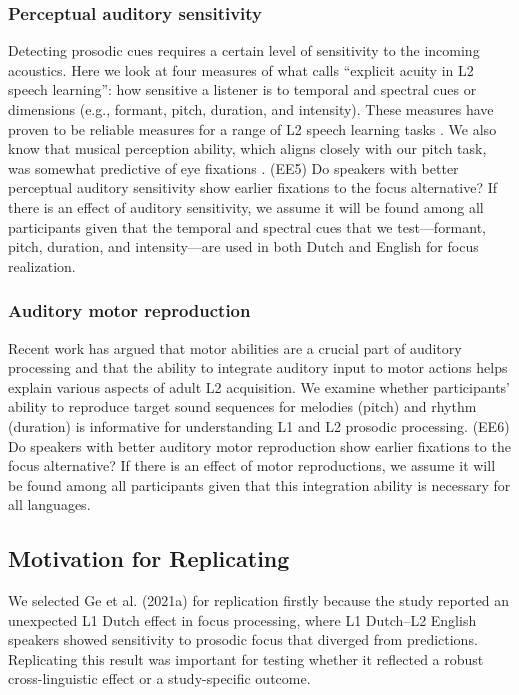 \subsubsection{Perceptual auditory sensitivity}
Detecting prosodic cues requires a certain level of sensitivity to the incoming acoustics. Here we look at four measures of what \textcite{saito2023does} calls “explicit acuity in L2 speech learning”: how sensitive a listener is to temporal and spectral cues or dimensions (e.g., formant,
pitch, duration, and intensity). These measures have proven to be reliable measures for a range of L2 speech learning tasks \parencite{Kachlicka_Saito_Tierney_2019, saito2024auditory, bakkouche2025effects, bramlett_wiener_24_speechprosody}. We also know that musical perception ability, which aligns closely with our pitch task, was somewhat predictive of eye fixations \textcite{jansen2023influence}. (EE5) Do speakers with better perceptual auditory sensitivity show earlier fixations to the focus alternative? If there is an effect of auditory sensitivity, we assume it will be found among all participants given that the temporal and spectral cues  that we test---formant, pitch, duration, and intensity---are used in both Dutch and English for focus realization.


\subsubsection{Auditory motor reproduction}
Recent work \parencite{tierney2014auditory, saito2024auditory,tierney2017individual} has argued that motor abilities are a crucial part of auditory processing and that the ability to integrate auditory input to motor actions helps explain various aspects of adult L2 acquisition. We examine whether participants' ability to reproduce target sound sequences for melodies (pitch) and rhythm (duration) is informative for understanding L1 and L2 prosodic processing. (EE6) Do speakers with better auditory motor reproduction show earlier fixations to the focus alternative? If there is an effect of motor reproductions, we assume it will be found among all participants given that this integration ability is necessary for all languages.

\subsection{Motivation for Replicating \textcite{ge2021a}}

We selected Ge et al. (2021a) for replication firstly because the study reported an unexpected L1 Dutch effect in focus processing, where L1 Dutch–L2 English speakers showed sensitivity to prosodic focus that diverged from predictions. Replicating this result was important for testing whether it reflected a robust cross-linguistic effect or a study-specific outcome.

